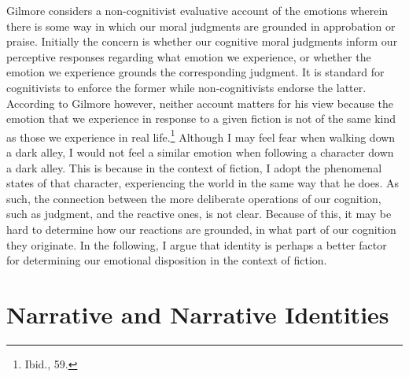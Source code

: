 \documentclass[phdthesis,12pt,final]{wuthesis}
\theoremstyle{definition}
\theoremstyle{definition}
\theoremstyle{definition}
\theoremstyle{definition}
\theoremstyle{remark}
\begin{document}
Gilmore considers a non-cognitivist evaluative account of the emotions wherein there is some way in which our moral judgments are grounded in approbation or praise. Initially the concern is whether our cognitive moral judgments inform our perceptive responses regarding what emotion we experience, or whether the emotion we experience grounds the corresponding judgment. It is standard for cognitivists to enforce the former while non-cognitivists endorse the latter. According to Gilmore however, neither account matters for his view because the emotion that we experience in response to a given fiction is not of the same kind as those we experience in real life.\footnote{Ibid., 59.} Although I may feel fear when walking down a dark alley, I would not feel a similar emotion when following a character down a dark alley. This is because in the context of fiction, I adopt the phenomenal states of that character, experiencing the world in the same way that he does. As such, the connection between the more deliberate operations of our cognition, such as judgment, and the reactive ones, is not clear. Because of this, it may be hard to determine how our reactions are grounded, in what part of our cognition they originate. In the following, I argue that identity is perhaps a better factor for determining our emotional disposition in the context of fiction.

\section{Narrative and Narrative Identities}\label{narrative-and-narrative-identities}
\end{document}
